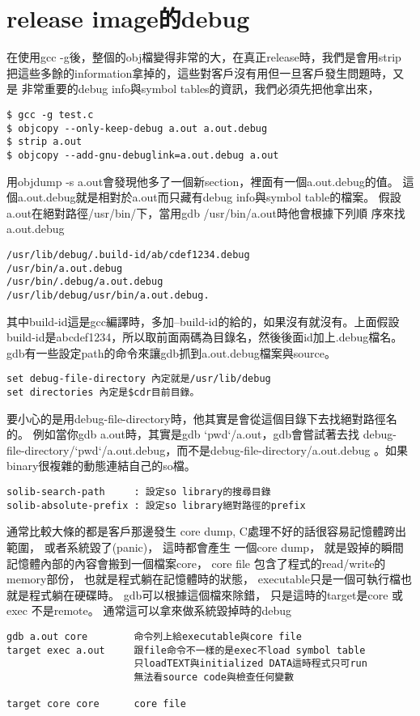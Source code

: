   \section{release image的debug}
  在使用gcc -g後，整個的obj檔變得非常的大，在真正release時，我們是會用strip
  把這些多餘的information拿掉的，這些對客戶沒有用但一旦客戶發生問題時，又是
  非常重要的debug info與symbol tables的資訊，我們必須先把他拿出來，
    \begin{verbatim} 
$ gcc -g test.c
$ objcopy --only-keep-debug a.out a.out.debug
$ strip a.out
$ objcopy --add-gnu-debuglink=a.out.debug a.out
    \end{verbatim} 
    用objdump -s a.out會發現他多了一個新section，裡面有一個a.out.debug的值。
    這個a.out.debug就是相對於a.out而只藏有debug info與symbol table的檔案。
    假設a.out在絕對路徑/usr/bin/下，當用gdb /usr/bin/a.out時他會根據下列順
    序來找a.out.debug
    \begin{verbatim} 
/usr/lib/debug/.build-id/ab/cdef1234.debug
/usr/bin/a.out.debug
/usr/bin/.debug/a.out.debug
/usr/lib/debug/usr/bin/a.out.debug. 
    \end{verbatim} 
    其中build-id這是gcc編譯時，多加--build-id的給的，如果沒有就沒有。上面假設
    build-id是abcdef1234，所以取前面兩碼為目錄名，然後後面id加上.debug檔名。
    gdb有一些設定path的命令來讓gdb抓到a.out.debug檔案與source。
    \begin{verbatim} 
set debug-file-directory 內定就是/usr/lib/debug
set directories 內定是$cdr目前目錄。
    \end{verbatim} 
    要小心的是用debug-file-directory時，他其實是會從這個目錄下去找絕對路徑名的。
    例如當你gdb a.out時，其實是gdb `pwd`/a.out，gdb會嘗試著去找
    debug-file-directory/`pwd`/a.out.debug，而不是debug-file-directory/a.out.debug
    。如果binary很複雜的動態連結自己的so檔。
    \begin{verbatim} 
solib-search-path     : 設定so library的搜尋目錄
solib-absolute-prefix : 設定so library絕對路徑的prefix
    \end{verbatim} 
    通常比較大條的都是客戶那邊發生 core dump, 
    C處理不好的話很容易記憶體跨出範圍， 或者系統毀了(panic)， 這時都會產生
    一個core dump， 就是毀掉的瞬間記憶體內部的內容會搬到一個檔案core，
    core file 包含了程式的read/write的memory部份， 也就是程式躺在記憶體時的狀態，
    executable只是一個可執行檔也就是程式躺在硬碟時。 gdb可以根據這個檔來除錯，
    只是這時的target是core 或exec 不是remote。
    通常這可以拿來做系統毀掉時的debug
    \begin{verbatim}	
gdb a.out core        命令列上給executable與core file
target exec a.out     跟file命令不一樣的是exec不load symbol table 
                      只loadTEXT與initialized DATA這時程式只可run
                      無法看source code與檢查任何變數

target core core      core file 
    \end{verbatim}
